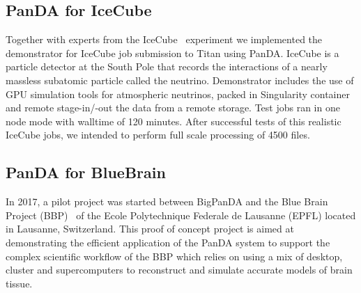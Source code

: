 \documentclass{webofc}
\begin{document}
\subsection{PanDA for IceCube} \label{section_icecube}

Together with experts from the IceCube~\cite{doi:10.1063/1.3480478} experiment we implemented the demonstrator for IceCube job submission to Titan using PanDA. 
IceCube is a particle detector at the South Pole that records the interactions of a nearly massless subatomic particle called the neutrino. 
Demonstrator includes the use of GPU simulation tools for atmospheric neutrinos, packed in Singularity container and remote stage-in/-out the data from a remote storage. 
Test jobs ran in one node mode with walltime of 120 minutes. After successful tests of this realistic IceCube jobs, we intended to perform full scale processing of 4500 files.


\subsection{PanDA for BlueBrain} \label{section_bluebrain}

In 2017, a pilot project was started between BigPanDA and the Blue Brain Project (BBP)~\cite{Markram:BBP} of the Ecole Polytechnique Federale de Lausanne (EPFL) located in Lausanne, Switzerland. This proof of concept project is aimed at demonstrating the efficient application of the PanDA system to support the complex scientific workflow of the BBP which relies on using a mix of desktop, cluster and supercomputers to reconstruct and simulate accurate models of brain tissue.
\end{document}
